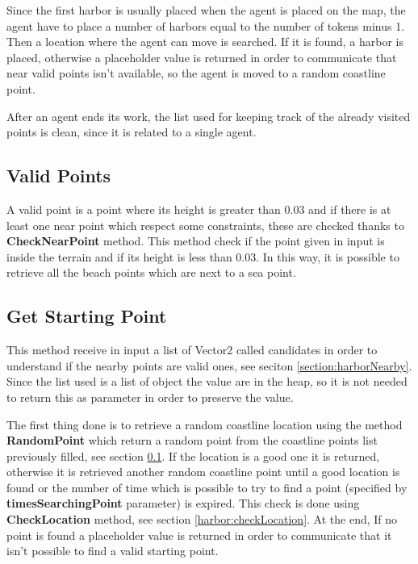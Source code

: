 \documentclass[12pt]{article}
\begin{document}
    Since the first harbor is usually placed when the agent is placed on the map, the agent have to place a number of harbors equal to the number of tokens minus 1. Then a 
    location where the agent can move is searched. If it is found, a harbor is placed, otherwise a placeholder value is returned in order to communicate that near valid points
    isn't available, so the agent is moved to a random coastline point.

    After an agent ends its work, the list used for keeping track of the already visited points is clean, since it is related to a single agent.

    \subsection{Valid Points} \label{section:HarborValidPoints}
    A valid point is a point where its height is greater than 0.03 and if there is at least one near point which respect some constraints, these are checked thanks to
    \textbf{CheckNearPoint} method. This method check if the point given in input is inside the terrain and if its height is less than 0.03. In this way, it is possible to
    retrieve all the beach points which are next to a sea point.

    \subsection{Get Starting Point} \label{section:harborStartingPoint}
    This method receive in input a list of Vector2 called candidates in order to understand if the nearby points are valid ones, see seciton \ref{section:harborNearby}. Since the list 
    used is a list of object the value are in the heap, so it is not needed to return this as parameter in order to preserve the value.

    The first thing done is to retrieve a random coastline location using the method \textbf{RandomPoint} which return a random point from the coastline points list previously
    filled, see section \ref{section:HarborValidPoints}. If the location is a good one it is returned, otherwise it is retrieved another random coastline point until a good
    location is found or the number of time which is possible to try to find a point (specified by \textbf{timesSearchingPoint} parameter) is expired.
    This check is done using \textbf{CheckLocation} method, see section \ref{harbor:checkLocation}. At the end, If no point is found a placeholder value is returned in order 
    to communicate that it isn't possible to find a valid starting point.
\end{document}
